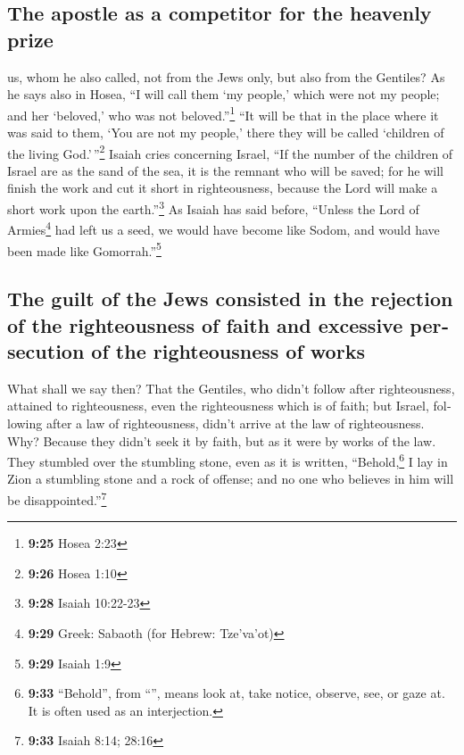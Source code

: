 \begin{paracol}{2}
\begin{otherlanguage}{english}
\hypertarget{the-apostle-as-a-competitor-for-the-heavenly-prize}{%
\subsection{The apostle as a competitor for the heavenly
prize}\label{the-apostle-as-a-competitor-for-the-heavenly-prize}}

 us, whom he also called, not from the Jews only, but
also from the Gentiles?  As he says also in Hosea, ``I
will call them `my people,' which were not my people; and her `beloved,'
who was not beloved.''\footnote{\textbf{9:25} Hosea 2:23}
 ``It will be that in the place where it was said to
them, `You are not my people,' there they will be called `children of
the living God.'\,''\footnote{\textbf{9:26} Hosea 1:10} 
Isaiah cries concerning Israel, ``If the number of the children of
Israel are as the sand of the sea, it is the remnant who will be saved;
 for he will finish the work and cut it short in
righteousness, because the Lord will make a short work upon the
earth.''\footnote{\textbf{9:28} Isaiah 10:22-23}  As
Isaiah has said before, ``Unless the Lord of Armies\footnote{\textbf{9:29}
  Greek: Sabaoth (for Hebrew: Tze'va'ot)} had left us a seed, we would
have become like Sodom, and would have been made like
Gomorrah.''\footnote{\textbf{9:29} Isaiah 1:9}

\hypertarget{the-guilt-of-the-jews-consisted-in-the-rejection-of-the-righteousness-of-faith-and-excessive-persecution-of-the-righteousness-of-works}{%
\subsection{The guilt of the Jews consisted in the rejection of the
righteousness of faith and excessive persecution of the righteousness of
works}\label{the-guilt-of-the-jews-consisted-in-the-rejection-of-the-righteousness-of-faith-and-excessive-persecution-of-the-righteousness-of-works}}

 What shall we say then? That the Gentiles, who didn't
follow after righteousness, attained to righteousness, even the
righteousness which is of faith;  but Israel, following
after a law of righteousness, didn't arrive at the law of righteousness.
 Why? Because they didn't seek it by faith, but as it
were by works of the law. They stumbled over the stumbling stone,
 even as it is written, ``Behold,\footnote{\textbf{9:33}
  ``Behold'', from ``'', means look at, take notice,
  observe, see, or gaze at. It is often used as an interjection.} I lay
in Zion a stumbling stone and a rock of offense; and no one who believes
in him will be disappointed.''\footnote{\textbf{9:33} Isaiah 8:14; 28:16}


\end{otherlanguage}
\end{paracol}
